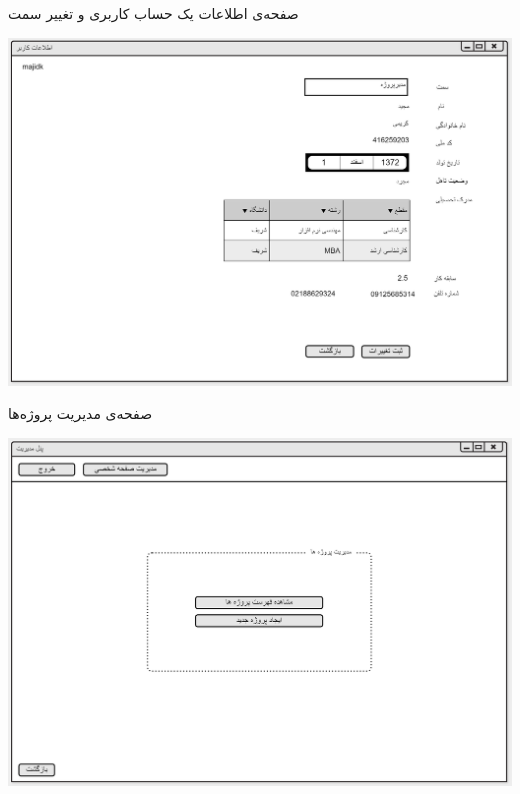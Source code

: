 \newpage
\vspace{1cm}
صفحه‌ی اطلاعات یک حساب کاربری و تغییر سمت 
\begin{center}
\includegraphics[width=\textwidth]{Prototype/HeadManager/ChangePosition.png}
\end{center}

\newpage
\vspace{1cm}
صفحه‌ی مدیریت پروژه‌ها
\begin{center}
\includegraphics[width=\textwidth]{Prototype/HeadManager/ProjectsManagement.png}
\end{center}

